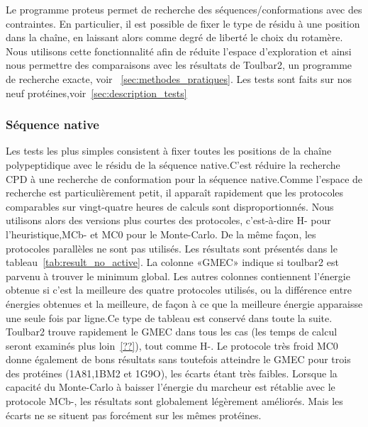 Le programme proteus permet de recherche des séquences/conformations avec des contraintes. En particulier, il est possible de fixer le type de résidu à une position dans la chaîne, en laissant alors comme degré de liberté le choix du rotamère. Nous utilisons cette fonctionnalité afin de réduite l'espace d'exploration et ainsi nous permettre des comparaisons avec les résultats de Toulbar2, un programme de recherche exacte, voir ~\ref{sec:methodes_pratiques}. Les tests sont faits sur nos neuf protéines,voir~\ref{sec:description_tests}

   \subsubsection{Séquence native}
Les tests les plus simples consistent à fixer toutes les positions de la chaîne polypeptidique avec le résidu de la séquence native.C'est réduire la recherche  CPD à une recherche de conformation pour la séquence native.Comme l'espace de recherche est particulièrement petit, il apparaît rapidement que les protocoles comparables sur vingt-quatre heures de calculs sont disproportionnés. Nous utilisons alors des versions plus courtes des protocoles, c'est-à-dire H- pour l'heuristique,MCb- et MC0 pour le Monte-Carlo. De la même façon, les protocoles parallèles ne sont pas utilisés. Les résultats sont présentés dans le tableau~\ref{tab:result_no_active}. La colonne «GMEC» indique si toulbar2 est parvenu à trouver le minimum global. Les autres colonnes contiennent l'énergie obtenue si c'est la meilleure des quatre protocoles utilisés, ou la différence entre énergies obtenues et la meilleure, de façon à ce que la meilleure énergie apparaisse une seule fois par ligne.Ce type de tableau est conservé dans toute la suite.  
Toulbar2  trouve rapidement le GMEC dans tous les cas (les temps de calcul seront examinés plus loin~\ref{??}), tout comme H-. Le protocole très froid MC0 donne également de bons résultats sans toutefois atteindre le GMEC pour trois des protéines (1A81,1BM2 et 1G9O), les écarts étant très faibles. Lorsque la capacité du Monte-Carlo à baisser l'énergie du marcheur est rétablie avec le protocole MCb-, les résultats sont globalement légèrement améliorés. Mais les écarts ne se situent pas forcément sur les mêmes protéines.
